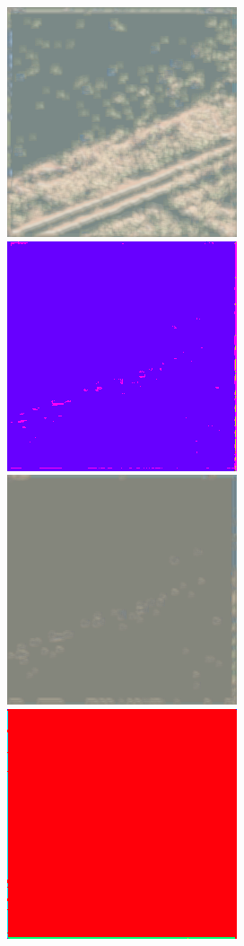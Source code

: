 \begin{figure}
    \includegraphics[width=\WnetPredictionsImageWidth]{images/wnet/46d-6/78905-restored} \hfill
    \includegraphics[width=\WnetPredictionsImageWidth]{images/wnet/36d-20/78905-prediction} \hfill
    \includegraphics[width=\WnetPredictionsImageWidth]{images/wnet/36d-20/78905-restored} \hfill
    \includegraphics[width=\WnetPredictionsImageWidth]{images/wnet/46d-20/78905-prediction} \hfill

\end{figure}

